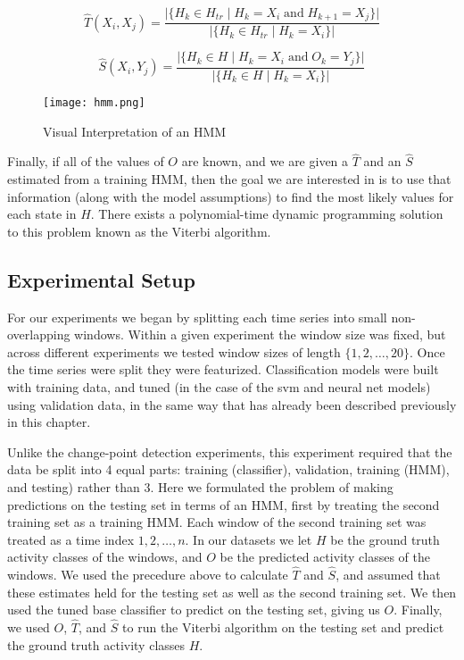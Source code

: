 \[
\hat{T}(X_i,X_j) = \frac{|\{H_k \in H_{tr} \; | \; H_k=X_i \; \text{and} \; H_{k+1}=X_j\}|} {|\{H_k \in H_{tr} \; | \; H_k=X_i\}|}
\]

\[
\hat{S}(X_i,Y_j) = \frac{|\{H_k \in H \; | \; H_k=X_i \; \text{and} \; O_k=Y_j\}|} {|\{H_k \in H \; | \; H_k=X_i\}|}
\]

\begin{figure}
 \centering
 \texttt{[image: hmm.png]}
 \caption{Visual Interpretation of an HMM}
 \label{fig:hmm}
\end{figure}

Finally, if all of the values of $O$ are known, and we are given
a $\hat{T}$ and an $\hat{S}$ estimated from a training HMM, then the goal we are interested in
is to use that information (along with the model assumptions)
to find the most likely values for each state in $H$. There
exists a polynomial-time dynamic programming solution to this problem known as
the Viterbi algorithm. \cite{russell10}

\subsection{Experimental Setup}

For our experiments we began by splitting each time series into small non-overlapping windows. Within a
given experiment the window size was fixed, but across different experiments we
tested window sizes of length $\{1,2, \ldots ,20\}$. Once the time series were
split they were featurized. Classification
models were built with training data,
and tuned (in the case of the svm and neural net models) using validation data,
in the same way that has already been described previously in this chapter.

Unlike the change-point detection experiments, this experiment required
that the data be split into 4 equal parts: training (classifier), validation,
training (HMM), and testing) rather than 3. 
Here we formulated the problem of making predictions on the testing set in terms
of an HMM, first by treating the second training set as a training HMM. Each
window of the second training set was treated as a time index ${1,2, \ldots, n}$.
In our datasets we
let $H$ be the ground truth activity classes of the windows, and $O$ be the
predicted activity classes of the windows. We used the precedure above to
calculate $\hat{T}$ and $\hat{S}$, and assumed that these estimates held for
the testing set as well as the second training set. We then used the
tuned base classifier to predict on the testing set, giving us $O$. Finally,
we used $O$, $\hat{T}$, and $\hat{S}$ to run the Viterbi algorithm on the
testing set and predict the ground truth activity classes $H$.
